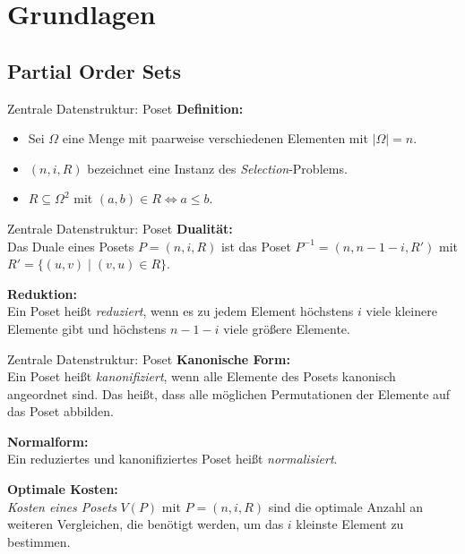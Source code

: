 \section{Grundlagen}

\subsection{Partial Order Sets}

\sectionframe{\insertsection}

\begin{frame}{Zentrale Datenstruktur: Poset}
  \textbf{Definition:}
  \vspace{1mm}
  \begin{itemize}
    \item Sei $\Omega$ eine Menge mit paarweise verschiedenen Elementen mit $\vert \Omega \vert = n$.
    \item $(n,i,R)$ bezeichnet eine Instanz des \textit{Selection}-Problems.
    \item $R \subseteq \Omega^2$ mit $(a,b) \in R \Leftrightarrow a \leq b$.
  \end{itemize}
  \vspace{2mm}
\end{frame}

\begin{frame}{Zentrale Datenstruktur: Poset}
  \textbf{Dualität:} \\
  \vspace{1mm}
  Das Duale eines Posets $P = (n, i, R)$ ist das Poset $P^{-1} = \left(n, n-1-i, R'\right)$ mit $R' = \{ (u,v) \; \vert \; (v,u) \in R\}$.

  \pause
  \vspace{2mm}
  \textbf{Reduktion:} \\
  \vspace{1mm}
  Ein Poset heißt \textit{reduziert}, wenn es zu jedem Element höchstens $i$ viele kleinere Elemente gibt und höchstens $n-1-i$ viele größere Elemente.
\end{frame}

\begin{frame}{Zentrale Datenstruktur: Poset}
  \textbf{Kanonische Form:} \\
  \vspace{1mm}
  Ein Poset heißt \textit{kanonifiziert}, wenn alle Elemente des Posets kanonisch angeordnet sind. Das heißt, dass alle möglichen Permutationen der Elemente auf das Poset abbilden.

  \pause
  \vspace{2mm}
  \textbf{Normalform:} \\
  \vspace{1mm}
  Ein reduziertes und kanonifiziertes Poset heißt \textit{normalisiert}.

  \pause
  \vspace{2mm}
  \textbf{Optimale Kosten:} \\
  \vspace{1mm}
  \textit{Kosten eines Posets} $V(P)$ mit $P=(n,i,R)$ sind die optimale Anzahl an weiteren Vergleichen, die benötigt werden, um das $i$ kleinste Element zu bestimmen.
\end{frame}

